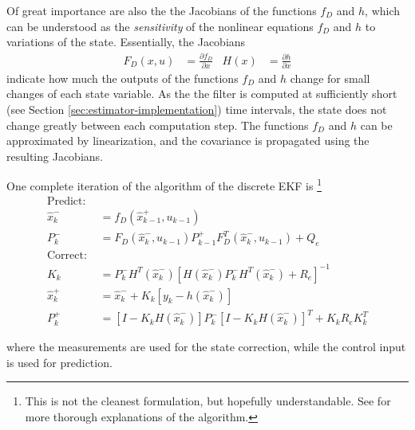 Of great importance are also the the Jacobians of the functions $f_D$ and $h$, which can be understood as the \textit{sensitivity} of the nonlinear equations $f_D$ and $h$ to variations of the state.
Essentially, the Jacobians 
\begin{align}
    F_D(x, u) &= \frac{\partial f_D}{\partial x}
    &
    H(x) &= \frac{\partial h}{\partial x}
\end{align}
indicate how much the outputs of the functions $f_D$ and $h$ change for small changes of each state variable. 
As the the filter is computed at sufficiently short (see Section \ref{sec:estimator-implementation}) time intervals, the state does not change greatly between each computation step.
The functions $f_D$ and $h$ can be approximated by linearization, and the covariance is propagated using the resulting Jacobians.

One complete iteration of the algorithm of the discrete EKF is \cite{lewis2008, werner2021b, minh2012} \footnote{This is not the cleanest formulation, but hopefully understandable. See \cite[pp. 259]{lewis2008} for more thorough explanations of the algorithm.}
\begin{align}
    \text{Predict: } \nonumber \\
     \hat x_k^- &= f_D(\hat x_{k-1}^+, u_{k-1}) \label{eq:predict_state} \\
    P_k^- &= F_D(\hat x_k^-, u_{k-1}) P_{k-1}^+ F_D^T(\hat x_k^-, u_{k-1}) + Q_e \label{eq:predict_cova}  \\
     \text{Correct: } \nonumber \\
    K_{k} &= P_{k}^{-} H^T(\hat x_{k}^{-}) \left[ H(\hat x_{k}^{-}) P_{k}^{-} H^T(\hat x_{k}^{-}) + R_e \right]^{-1} \label{eq:update_gain} \\
    \hat x_{k}^{+} &= \hat x_{k}^{-} + K_{k} \left[ y_{k} - h(\hat x_{k}^{-}) \right] \label{eq:update_state}\\
    P_{k}^{+} &= \left[ I - K_{k} H(\hat x_{k}^{-}) \right] P_{k}^{-}\left[ I - K_{k} H(\hat x_{k}^{-}) \right]^T +  K_{k} R_e K_{k}^T \label{eq:update_cova}
\end{align}



where the measurements are used for the state correction, while the control input is used for prediction.


